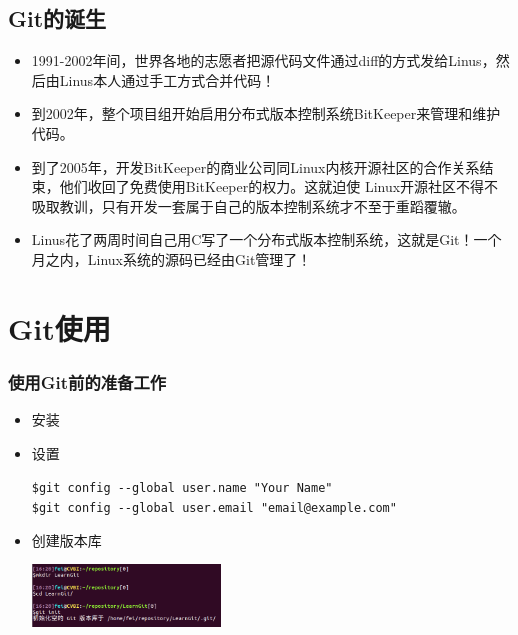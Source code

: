 \documentclass[notheorems,mathserif,table,compress]{beamer}  %
\begin{document}
\subsection{Git的诞生}

\begin{frame}
  \begin{itemize}
  \item 1991-2002年间，世界各地的志愿者把源代码文件通过diff的方式发给Linus，然后由Linus本人通过手工方式合并代码！
  \item 到2002年，整个项目组开始启用分布式版本控制系统BitKeeper来管理和维护代码。
  \item 到了2005年，开发BitKeeper的商业公司同Linux内核开源社区的合作关系结束，他们收回了免费使用BitKeeper的权力。这就迫使 Linux开源社区不得不吸取教训，只有开发一套属于自己的版本控制系统才不至于重蹈覆辙。
  \item Linus花了两周时间自己用C写了一个分布式版本控制系统，这就是Git！一个月之内，Linux系统的源码已经由Git管理了！
  \end{itemize}
\end{frame}

\section{Git使用}

\begin{frame}[fragile]
  \frametitle{使用Git前的准备工作}
  \begin{itemize}
  \item 安装
  \item 设置

  \verb|$git config --global user.name "Your Name"|\\
  \verb|$git config --global user.email "email@example.com"|
  \item 创建版本库

  \hspace{0.2em}\vspace{1em}\includegraphics[width=5cm]{repository.png}
  \end{itemize}
\end{frame}


\end{document}
